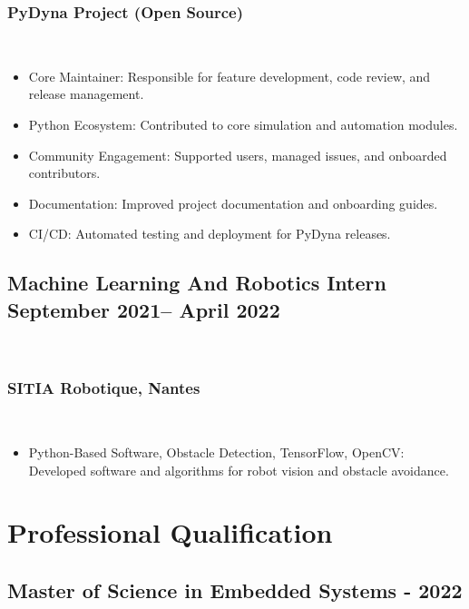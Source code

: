 \documentclass[12pt]{article}
\begin{document}
\subsubsection{PyDyna Project (Open Source)} \\ \smallskip
\begin{itemize}
    \item[\textbullet] Core Maintainer: Responsible for feature development, code review, and release management.
    \item[\textbullet] Python Ecosystem: Contributed to core simulation and automation modules.
    \item[\textbullet] Community Engagement: Supported users, managed issues, and onboarded contributors.
    \item[\textbullet] Documentation: Improved project documentation and onboarding guides.
    \item[\textbullet] CI/CD: Automated testing and deployment for PyDyna releases.
\end{itemize}

\subsection{Machine Learning And Robotics Intern \hfill \normalfont September 2021-- April 2022} \\ \smallskip
\subsubsection{SITIA Robotique, Nantes} \\ \smallskip
\begin{itemize}
    \item[\textbullet] Python-Based Software, Obstacle Detection, TensorFlow, OpenCV: Developed software and algorithms for robot vision and obstacle avoidance.
\end{itemize}

\section{Professional Qualification}
\subsection{Master of Science in Embedded Systems \hfill {} - 2022} \\ \smallskip
\end{document}
